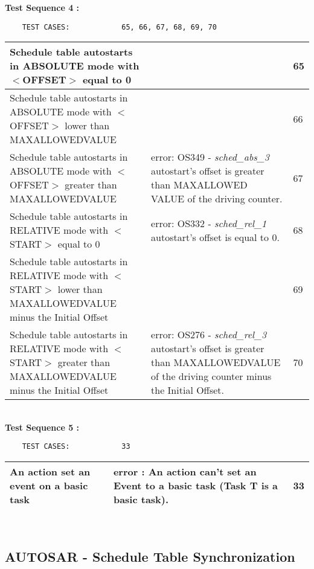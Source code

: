 \documentclass[10pt]{article}
\newlength{\Li}\settowidth{\Li}{Running}
\newlength{\Lii}\setlength{\Lii}{7cm}
\newlength{\Liiii}\setlength{\Liiii}{0.9cm}
\newlength{\Liii}\setlength{\Liii}{\textwidth} \addtolength{\Liii}{-\Li} \addtolength{\Liii}{-\Lii} \addtolength{\Liii}{-\Liiii}
\begin{document}
	\textbf{Test Sequence 4 :}
	\begin{lstlisting}
	TEST CASES:		       65, 66, 67, 68, 69, 70
	\end{lstlisting}
	

	\begin{supertabular}{|p{\Li}|p{\Lii}|p{\Liii}|} \hline 
	Schedule table autostarts in ABSOLUTE mode with $<$OFFSET$>$ equal to 0						& 															& 65 \\ \hline
	Schedule table autostarts in ABSOLUTE mode with $<$OFFSET$>$ lower than MAXALLOWEDVALUE		& 															& 66 \\ \hline
	Schedule table autostarts in ABSOLUTE mode with $<$OFFSET$>$ greater than MAXALLOWEDVALUE	& error: OS349 - \textit{sched\_abs\_3} autostart's offset is greater than MAXALLOWED VALUE of the driving counter.& 67 \\ \hline
	Schedule table autostarts in RELATIVE mode with $<$START$>$ equal to 0							& error: OS332 - \textit{sched\_rel\_1} autostart's offset is equal to 0.			& 68 \\ \hline	
	Schedule table autostarts in RELATIVE mode with $<$START$>$ lower than MAXALLOWEDVALUE minus the Initial Offset	& 													& 69 \\ \hline	
	Schedule table autostarts in RELATIVE mode with $<$START$>$ greater than MAXALLOWEDVALUE minus the Initial Offset	& error: OS276 - \textit{sched\_rel\_3} autostart's offset is greater than MAXALLOWEDVALUE of the driving counter minus the Initial Offset.	& 70 \\ \hline	
	\end{supertabular}\\
	
	\textbf{Test Sequence 5 :}
	\begin{lstlisting}
	TEST CASES:		       33
	\end{lstlisting}
	

	\begin{supertabular}{|p{\Li}|p{\Lii}|p{\Liii}|} \hline 
	An action set an event on a basic task 							& error : An action can't set an Event to a basic task (Task T is a basic task).											& 33 \\ \hline
	\end{supertabular}\\

\subsection{AUTOSAR - Schedule Table Synchronization}
	
\end{document}
